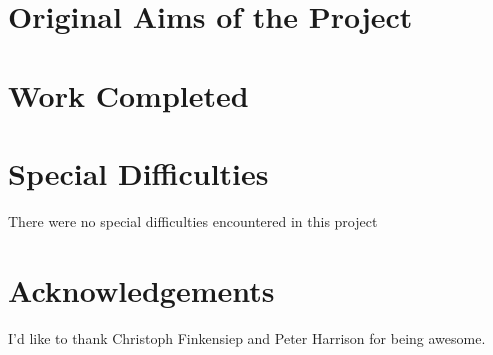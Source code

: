 \documentclass[12pt,a4paper,twoside,openany]{report} \usepackage[pdfborder={0 0 0}]{hyperref}    %
\renewcommand{\baselinestretch}{1.05}    %
\theoremstyle{definition} \newtheorem{definition}{Definition}[section]
\begin{document}
      

    \section*{Original Aims of the Project}


    \section*{Work Completed}



    \section*{Special Difficulties} There were no special difficulties encountered in this project

    \newpage { \renewcommand{\baselinestretch}{0.75}\normalsize \tableofcontents
    \renewcommand{\baselinestretch}{1.0}\normalsize }

    \newpage \section*{Acknowledgements} I'd like to thank Christoph Finkensiep and Peter Harrison for being awesome.




    \pagestyle{headings}

\end{document}
